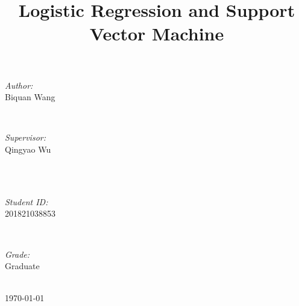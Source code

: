 \documentclass[journal, a4paper]{IEEEtran}
\begin{document}
\begin{titlepage}
\begin{minipage}{0.4\textwidth}
\begin{flushleft} \large
\emph{Author:}\\
Biquan Wang %
\end{flushleft}
\end{minipage}
~
\begin{minipage}{0.4\textwidth}
\begin{flushright} \large
\emph{Supervisor:} \\
Qingyao Wu %
\end{flushright}
\end{minipage}\\[2cm]
~
\begin{minipage}{0.4\textwidth}
\begin{flushleft} \large
\emph{Student ID:}\\
201821038853
\end{flushleft}
\end{minipage}
~
\begin{minipage}{0.4\textwidth}
\begin{flushright} \large
\emph{Grade:} \\
Graduate
\end{flushright}
\end{minipage}\\[2cm]



{\large \today}\\[2cm] %

 

\vfill %

\end{titlepage}

	\title{Logistic Regression and Support Vector Machine}
	\maketitle
\end{document}
